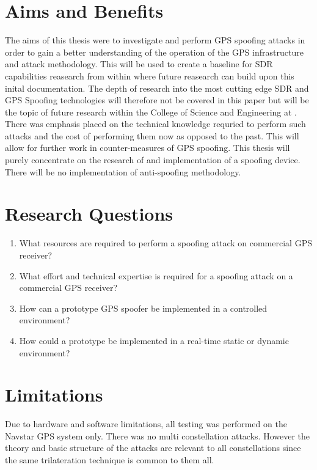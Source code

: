 \section{Aims and Benefits}\label{sec:Aims}
The aims of this thesis were to investigate and perform GPS spoofing attacks in order to gain a better understanding of the operation of the GPS infrastructure and attack
methodology. This will be used to create a baseline for SDR capabilities reasearch from within \univname where future reasearch can build upon this inital documentation.
The depth of research into the most cutting edge SDR and GPS Spoofing technologies will therefore not be covered in this paper but will be the topic of future research
within the College of Science and Engineering at \univname.
There was  emphasis placed on the technical knowledge requried to perform such attacks and the cost of performing them now as opposed to the past. This will
allow for further work in counter-measures of GPS spoofing.
This thesis will purely concentrate on the research of and implementation of a spoofing device. There will be no implementation of anti-spoofing methodology.

\section{Research Questions}\label{sec:RQs}
\begin{enumerate}
    \item What resources are required to perform a spoofing attack on commercial GPS receiver?
    \item What effort and technical expertise is required for a spoofing attack on a commercial GPS receiver?
    \item How can a prototype GPS spoofer be implemented in a controlled environment?
    \item How could a prototype be implemented in a real-time static or dynamic environment? 
\end{enumerate}

\section{Limitations}\label{sec:Limits}
Due to hardware and software limitations, all testing was performed on the Navstar GPS system only. There was no multi constellation attacks. However the theory and basic
structure of the attacks are relevant to all constellations since the same trilateration technique is common to them all.

